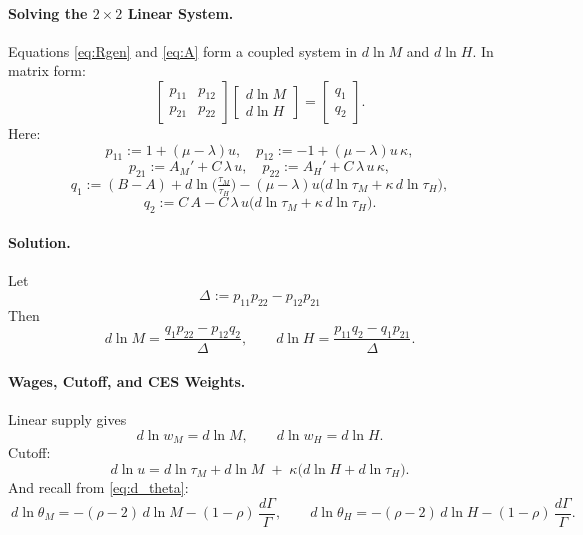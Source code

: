 \documentclass[english]{article}
\begin{document}
\paragraph{Solving the $2\times 2$ Linear System.}
Equations \eqref{eq:Rgen} and \eqref{eq:A} form a coupled system in $d\ln M$ and $d\ln H$.
In matrix form:
\begin{equation}\label{eq:matrix-form}
\begin{bmatrix}
p_{11} & p_{12} \\
p_{21} & p_{22}
\end{bmatrix}
\begin{bmatrix}
d\ln M \\[2pt]
d\ln H
\end{bmatrix}
=
\begin{bmatrix}
q_{1} \\[2pt]
q_{2}
\end{bmatrix}.
\end{equation}
Here:
\[
p_{11} := 1+(\mu-\lambda)u, \quad p_{12} := -1+(\mu-\lambda)u\,\kappa,
\]
\[
p_{21} := A_M' + C\,\lambda\,u, \quad p_{22} := A_H' + C\,\lambda\,u\,\kappa,
\]
\[
q_{1}  := (B-A) + d\ln\!\Big(\tfrac{\tau_M}{\tau_H}\Big) 
          - (\mu-\lambda)u\Big(d\ln\tau_M+\kappa\,d\ln\tau_H\Big),
\]
\[
q_{2}  := C\,A - C\,\lambda\,u\Big(d\ln \tau_M + \kappa\,d\ln \tau_H\Big).
\]

\paragraph{Solution.}
Let
\[
\Delta := p_{11}p_{22} - p_{12}p_{21}
\]
Then
\begin{equation}
\boxed{~d\ln M=\frac{q_1 p_{22}-p_{12}q_2}{\Delta},\qquad
d\ln H=\frac{p_{11}q_2-q_1 p_{21}}{\Delta}.~}
\end{equation}

\paragraph{Wages, Cutoff, and CES Weights.}
Linear supply gives
\[
\boxed{~d\ln w_M=d\ln M,\qquad d\ln w_H=d\ln H.~}
\]
Cutoff:
\[
\boxed{~d\ln u=d\ln \tau_M + d\ln M \;+\; \kappa\big(d\ln H + d\ln \tau_H\big).~}
\]
And recall from \eqref{eq:d_theta}:
\begin{equation}
\boxed{~d\ln\theta_M=-(\rho-2)\,d\ln M-(1-\rho)\,\frac{d\Gamma}{\Gamma},\qquad
d\ln\theta_H=-(\rho-2)\,d\ln H-(1-\rho)\,\frac{d\Gamma}{\Gamma}.~}
\end{equation}
\end{document}
